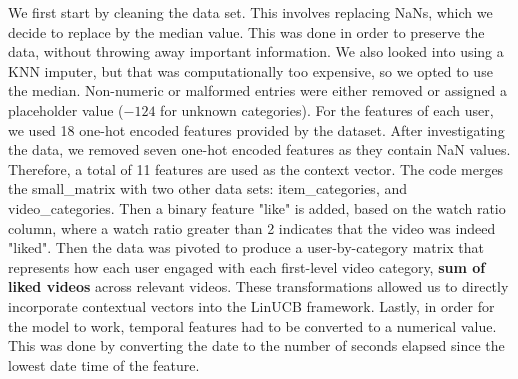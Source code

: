 We first start by cleaning the data set. This involves replacing NaNs, which we decide to replace by the median value. This was done in order to preserve the data, without throwing away important information. We also looked into using a KNN imputer, but that was computationally too expensive, so we opted to use the median. Non-numeric or malformed entries were either removed or assigned a placeholder value (\(-124\) for unknown categories). For the features of each user, we used 18 one-hot encoded features provided by the dataset. After investigating the data, we removed seven one-hot encoded features as they contain NaN values. Therefore, a total of 11 features are used as the context vector. The code merges the small\_matrix with two other data sets: item\_categories, and video\_categories. Then a binary feature "like" is added, based on the watch ratio column, where a watch ratio greater than 2 indicates that the video was indeed "liked". Then the data was pivoted to produce a user-by-category matrix that represents how each user engaged with each first-level video category, \textbf{sum of liked videos} across relevant videos. These transformations allowed us to directly incorporate contextual vectors into the LinUCB framework. Lastly, in order for the model to work, temporal features had to be converted to a numerical value. This was done by converting the date to the number of seconds elapsed since the lowest date time of the feature.
